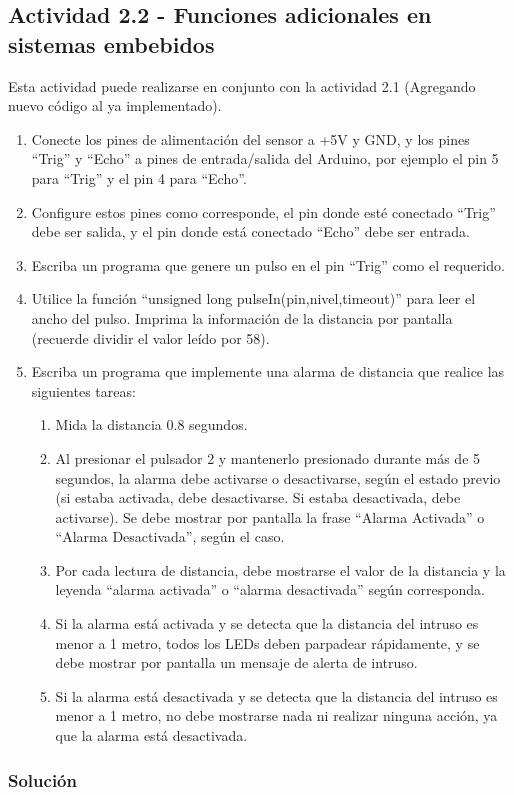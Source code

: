 \documentclass{article}
\begin{document}
\subsection*{Actividad 2.2 - Funciones adicionales en sistemas embebidos}

Esta actividad puede realizarse en conjunto con la actividad 2.1 (Agregando nuevo código al ya implementado).

\begin{enumerate}[leftmargin=0pt]
\item Conecte los pines de alimentación del sensor a +5V y GND, y los pines “Trig” y “Echo” a pines de entrada/salida del Arduino, por ejemplo el pin 5 para “Trig” y el pin 4 para “Echo”.

\item Configure estos pines como corresponde, el pin donde esté conectado “Trig” debe ser salida, y el pin donde está conectado “Echo” debe ser entrada.

\item Escriba un programa que genere un pulso en el pin “Trig” como el requerido.

\item Utilice la función “unsigned long pulseIn(pin,nivel,timeout)” para leer el ancho del pulso. Imprima la información de la distancia por pantalla (recuerde dividir el valor leído por 58).

\pagebreak
\item Escriba un programa que implemente una alarma de distancia que realice las siguientes tareas:
\begin{enumerate}
    \item Mida la distancia 0.8 segundos.
    \item Al presionar el pulsador 2 y mantenerlo presionado durante más de 5 segundos, la alarma debe activarse o desactivarse, según el estado previo (si estaba activada, debe desactivarse. Si estaba desactivada, debe activarse). Se debe mostrar por pantalla la frase “Alarma Activada” o “Alarma Desactivada”, según el caso.
    \item Por cada lectura de distancia, debe mostrarse el valor de la distancia y la leyenda “alarma activada” o “alarma desactivada” según corresponda.
    \item Si la alarma está activada y se detecta que la distancia del intruso es menor a 1 metro, todos los LEDs deben parpadear rápidamente, y se debe mostrar por pantalla un mensaje de alerta de intruso.
    \item Si la alarma está desactivada y se detecta que la distancia del intruso es menor a 1 metro, no debe mostrarse nada ni realizar ninguna acción, ya que la alarma está desactivada.
\end{enumerate}
\end{enumerate}

\subsubsection*{Solución}
\end{document}
